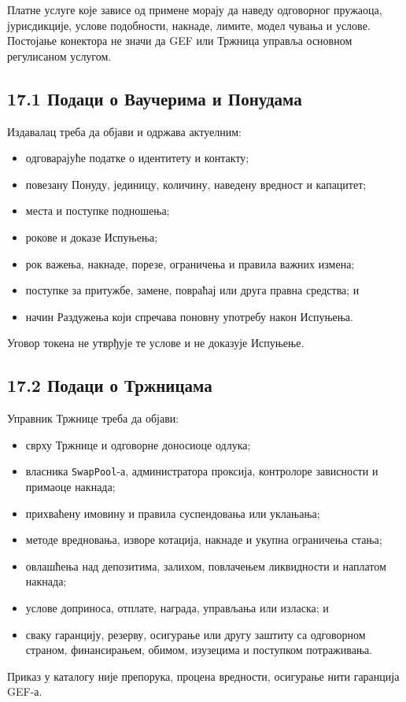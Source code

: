 \documentclass[11pt]{article}
\begin{document}
Платне услуге које зависе од примене морају да наведу одговорног пружаоца, јурисдикције, услове подобности, накнаде, лимите, модел чувања и услове. Постојање конектора не значи да GEF или Тржница управља основном регулисаном услугом.

\subsection*{17.1 Подаци о Ваучерима и Понудама}

Издавалац треба да објави и одржава актуелним:

\begin{itemize}[leftmargin=*]
\item одговарајуће податке о идентитету и контакту;
\item повезану Понуду, јединицу, количину, наведену вредност и капацитет;
\item места и поступке подношења;
\item рокове и доказе Испуњења;
\item рок важења, накнаде, порезе, ограничења и правила важних измена;
\item поступке за притужбе, замене, повраћај или друга правна средства; и
\item начин Раздужења који спречава поновну употребу након Испуњења.
\end{itemize}
Уговор токена не утврђује те услове и не доказује Испуњење.

\subsection*{17.2 Подаци о Тржницама}

Управник Тржнице треба да објави:

\begin{itemize}[leftmargin=*]
\item сврху Тржнице и одговорне доносиоце одлука;
\item власника \texttt{SwapPool}-а, администратора проксија, контролоре зависности и примаоце накнада;
\item прихваћену имовину и правила суспендовања или уклањања;
\item методе вредновања, изворе котација, накнаде и укупна ограничења стања;
\item овлашћења над депозитима, залихом, повлачењем ликвидности и наплатом накнада;
\item услове доприноса, отплате, награда, управљања или изласка; и
\item сваку гаранцију, резерву, осигурање или другу заштиту са одговорном страном, финансирањем, обимом, изузецима и поступком потраживања.
\end{itemize}
Приказ у каталогу није препорука, процена вредности, осигурање нити гаранција GEF-а.
\end{document}
